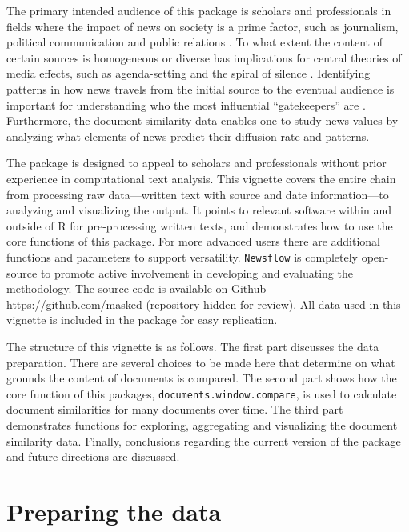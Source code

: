 \documentclass[]{article}
\begin{document}
The primary intended audience of this package is scholars and
professionals in fields where the impact of news on society is a prime
factor, such as journalism, political communication and public relations
\citep{baum08, boczkowski07, ragas14}. To what extent the content of
certain sources is homogeneous or diverse has implications for central
theories of media effects, such as agenda-setting and the spiral of
silence \citep{bennett08, blumler99}. Identifying patterns in how news
travels from the initial source to the eventual audience is important
for understanding who the most influential ``gatekeepers'' are
\citep{shoemaker09}. Furthermore, the document similarity data enables
one to study news values \citep{galtung65} by analyzing what elements of
news predict their diffusion rate and patterns.

The package is designed to appeal to scholars and professionals without
prior experience in computational text analysis. This vignette covers
the entire chain from processing raw data---written text with source and
date information---to analyzing and visualizing the output. It points to
relevant software within and outside of R for pre-processing written
texts, and demonstrates how to use the core functions of this package.
For more advanced users there are additional functions and parameters to
support versatility. \texttt{Newsflow} is completely open-source to
promote active involvement in developing and evaluating the methodology.
The source code is available on Github---\url{https://github.com/masked}
(repository hidden for review). All data used in this vignette is
included in the package for easy replication.

The structure of this vignette is as follows. The first part discusses
the data preparation. There are several choices to be made here that
determine on what grounds the content of documents is compared. The
second part shows how the core function of this packages,
\texttt{documents.window.compare}, is used to calculate document
similarities for many documents over time. The third part demonstrates
functions for exploring, aggregating and visualizing the document
similarity data. Finally, conclusions regarding the current version of
the package and future directions are discussed.

\section{Preparing the data}\label{preparing-the-data}
\end{document}
